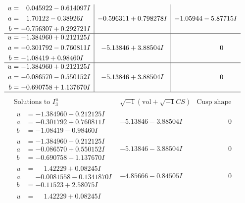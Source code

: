 \documentclass[1p]{elsarticle_modified}
\theoremstyle{definition}
\newcommand{\I}{\sqrt{-1}}
\begin{document}
$$\begin{array}{c|c|c}
\begin{aligned}
u &= \phantom{-}0.045922 - 0.614097 I \\
a &= \phantom{-}1.70122 - 0.38926 I \\
b &= -0.756307 + 0.292721 I\end{aligned}
 & -0.596311 + 0.798278 I & -1.05944 - 5.87715 I \\ \hline\begin{aligned}
u &= -1.384960 + 0.212125 I \\
a &= -0.301792 - 0.760811 I \\
b &= -1.08419 + 0.98460 I\end{aligned}
 & -5.13846 + 3.88504 I & \phantom{-0.000000 } 0 \\ \hline\begin{aligned}
u &= -1.384960 + 0.212125 I \\
a &= -0.086570 - 0.550152 I \\
b &= -0.690758 + 1.137670 I\end{aligned}
 & -5.13846 + 3.88504 I & \phantom{-0.000000 } 0\\
 \hline 
 \end{array}$$\newpage$$\begin{array}{c|c|c}  
\text{Solutions to }I^u_{3}& \I (\text{vol} + \sqrt{-1}CS) & \text{Cusp shape}\\
 \hline 
\begin{aligned}
u &= -1.384960 - 0.212125 I \\
a &= -0.301792 + 0.760811 I \\
b &= -1.08419 - 0.98460 I\end{aligned}
 & -5.13846 - 3.88504 I & \phantom{-0.000000 } 0 \\ \hline\begin{aligned}
u &= -1.384960 - 0.212125 I \\
a &= -0.086570 + 0.550152 I \\
b &= -0.690758 - 1.137670 I\end{aligned}
 & -5.13846 - 3.88504 I & \phantom{-0.000000 } 0 \\ \hline\begin{aligned}
u &= \phantom{-}1.42229 + 0.08245 I \\
a &= -0.0081558 - 0.1341870 I \\
b &= -0.11523 + 2.58075 I\end{aligned}
 & -4.85666 - 0.84505 I & \phantom{-0.000000 } 0 \\ \hline\begin{aligned}
u &= \phantom{-}1.42229 + 0.08245 I \\

\end{aligned}
\end{array}$$
\end{document}
